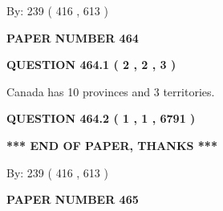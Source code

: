 \documentclass[12pt]{article}
\begin{document}
   
\hspace{1.0in} By: 
 239 ( 416 ,  613 )
   
   
   
   
\newpage 
\setcounter{page}{ 
   464001 } 
   
   
   
   
 {\textbf{ \Large{ PAPER NUMBER  464  }}}
   
   
\vspace{0.2in}
   
   
   
   
   
   
 \vspace{0.2in}
 
 
 
 
   
   
  
\vspace{0.2in}
  
{\textbf{\Large{QUESTION
464.1 
 ( 2 , 2 , 3 )
}}}
  
  
 
 
\noindent{}
 
 
Canada has 10  provinces and 3 territories.
 
 
 
 
  
\vspace{0.2in}
  
{\textbf{\Large{QUESTION
464.2 
 ( 1 , 1 , 6791 )
}}}
  
  
   
   
 \vspace{0.2in}
 
   
   
   
   
\vspace{1.0in} 
{\textbf{\large{ *** END OF PAPER, THANKS *** }}} 
   
   
\hspace{1.0in} By: 
 239 ( 416 ,  613 )
   
   
   
   
\newpage 
\setcounter{page}{ 
   465001 } 
   
   
   
   
 {\textbf{ \Large{ PAPER NUMBER  465  }}}
   
\end{document}
